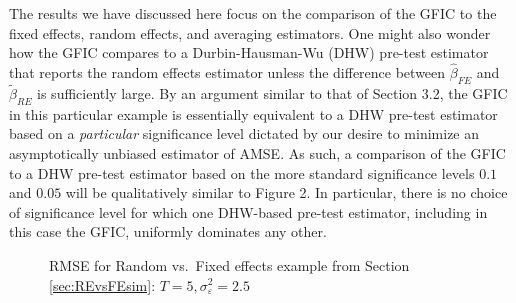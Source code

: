 The results we have discussed here focus on the comparison of the GFIC to the fixed effects, random effects, and averaging estimators.
One might also wonder how the GFIC compares to a Durbin-Hausman-Wu (DHW) pre-test estimator that reports the random effects estimator unless the difference between $\widehat{\beta}_{FE}$ and $\widetilde{\beta}_{RE}$ is sufficiently large.
By an argument similar to that of \cite{DiTraglia2016} Section 3.2, the GFIC in this particular example is essentially equivalent to a DHW pre-test estimator based on a \emph{particular} significance level dictated by our desire to minimize an asymptotically unbiased estimator of AMSE.
As such, a comparison of the GFIC to a DHW pre-test estimator based on the more standard significance levels $0.1$ and $0.05$ will be qualitatively similar to \cite{DiTraglia2016} Figure 2.
In particular, there is no choice of significance level for which one DHW-based pre-test estimator, including in this case the GFIC, uniformly dominates any other.



\begin{figure}[H]
  \centering
  
  \caption{RMSE for Random vs.\ Fixed effects example from Section \ref{sec:REvsFEsim}: $T=5, \sigma_{\varepsilon}^2 = 2.5$}
  \label{fig:REvsFE_T5}
\end{figure}

